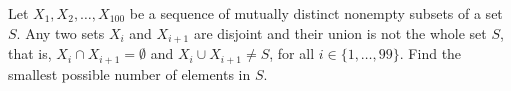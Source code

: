 Let $X_1, X_2, \ldots, X_{100}$ be a sequence of mutually distinct nonempty subsets of a set $S$.  Any two sets $X_i$ and $X_{i+1}$ are disjoint and their union is not the whole set $S$,  that is, $X_i\cap X_{i+1}=\emptyset$ and $X_i\cup X_{i+1}\neq S$,  for all $i\in\{1, \ldots, 99\}$.  Find the smallest possible number of elements in $S$.